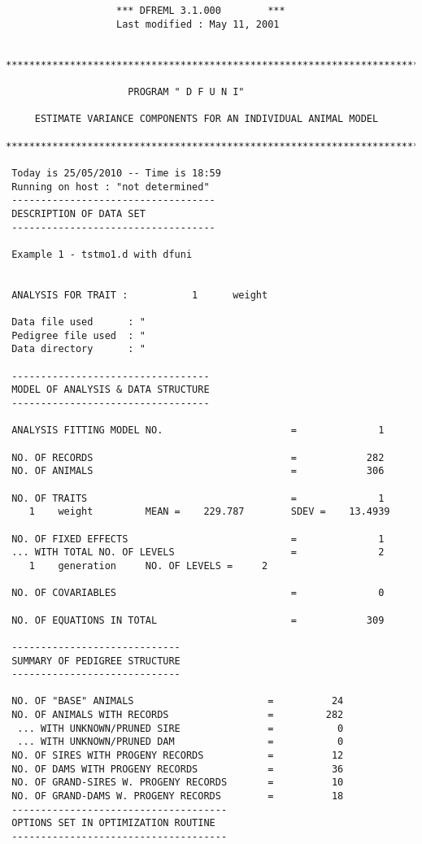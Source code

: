 \documentclass[titlepage]{article}  %
\begin{document}
\begin{verbatim}
                   *** DFREML 3.1.000        ***
                   Last modified : May 11, 2001   


********************************************************************************

                     PROGRAM " D F U N I" 
  
     ESTIMATE VARIANCE COMPONENTS FOR AN INDIVIDUAL ANIMAL MODEL

****************************************************************************KM**

 Today is 25/05/2010 -- Time is 18:59
 Running on host : "not determined" 
 -----------------------------------
 DESCRIPTION OF DATA SET
 -----------------------------------
  
 Example 1 - tstmo1.d with dfuni                                                
 
  
 ANALYSIS FOR TRAIT :           1      weight      
  
 Data file used      : "
 Pedigree file used  : "
 Data directory      : "
  
 ----------------------------------
 MODEL OF ANALYSIS & DATA STRUCTURE
 ----------------------------------
  
 ANALYSIS FITTING MODEL NO.                      =              1
  
 NO. OF RECORDS                                  =            282
 NO. OF ANIMALS                                  =            306
  
 NO. OF TRAITS                                   =              1
    1    weight         MEAN =    229.787        SDEV =    13.4939    
  
 NO. OF FIXED EFFECTS                            =              1
 ... WITH TOTAL NO. OF LEVELS                    =              2
    1    generation     NO. OF LEVELS =     2
  
 NO. OF COVARIABLES                              =              0
  
 NO. OF EQUATIONS IN TOTAL                       =            309
  
 -----------------------------
 SUMMARY OF PEDIGREE STRUCTURE
 -----------------------------
  
 NO. OF "BASE" ANIMALS                       =          24
 NO. OF ANIMALS WITH RECORDS                 =         282
  ... WITH UNKNOWN/PRUNED SIRE               =           0
  ... WITH UNKNOWN/PRUNED DAM                =           0
 NO. OF SIRES WITH PROGENY RECORDS           =          12
 NO. OF DAMS WITH PROGENY RECORDS            =          36
 NO. OF GRAND-SIRES W. PROGENY RECORDS       =          10
 NO. OF GRAND-DAMS W. PROGENY RECORDS        =          18
 -------------------------------------
 OPTIONS SET IN OPTIMIZATION ROUTINE 
 -------------------------------------
  

\end{verbatim}
\end{document}
